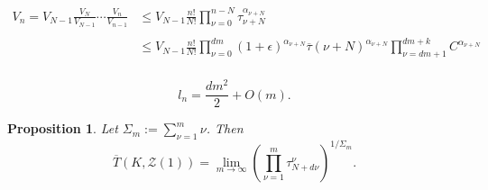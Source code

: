 \documentclass[10pt,a4paper]{amsart}
\newtheorem{proposition}{Proposition}
\newcommand{\calZ}{\mathcal{Z}}
\newcommand{\stau}{\overline\tau}
\begin{document}
\begin{equation}\label{eqn:tp} \begin{aligned}
V_n=V_{N-1}\frac{V_{N}}{V_{N-1}}\cdots\frac{V_n}{V_{n-1}}&\leq V_{N-1} \frac{n!}{N!} \prod_{\nu=0}^{n-N}  \tau_{\nu+N}^{\alpha_{\nu+N}} \\ 
&   \\
&\leq V_{N-1} \frac{n!}{N!} \prod_{\nu=0}^{dm} (1+\epsilon)^{\alpha_{\nu+N}}\stau(\nu+N)^{\alpha_{\nu+N}} 
 \prod_{\nu=dm+1}^{dm+k} C^{\alpha_{\nu+N}} \\ 
\end{aligned}\end{equation}

\begin{equation}\label{eqn:ln} l_n=\frac{dm^2}{2}+O(m).\end{equation}

\begin{proposition} \label{prop:13}
Let $\Sigma_m:=\sum_{\nu=1}^m \nu$.  Then
\begin{equation}\label{eqn:TZ1}
\overline T(K,\calZ(1)) = \lim_{m\to\infty} \left(\prod_{\nu=1}^m \tau_{N+d\nu}^{\nu}\right)^{1/\Sigma_m} .
\end{equation}
\end{proposition}
\end{document}
